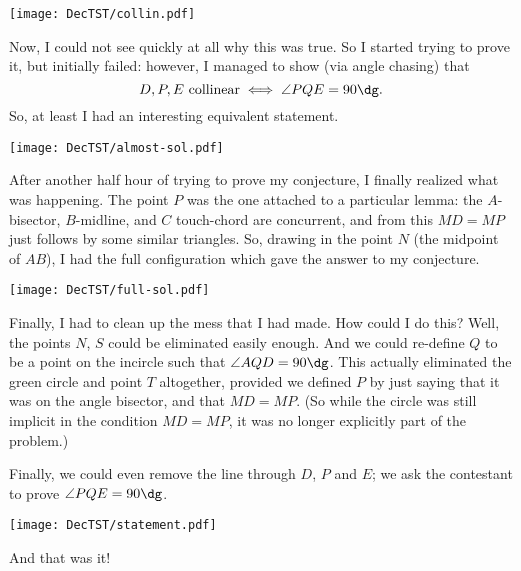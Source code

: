 \documentclass[11pt]{scrartcl}
\begin{document}
\begin{center}
  \texttt{[image: DecTST/collin.pdf]}
\end{center}

Now, I could not see quickly at all why this was true.
So I started trying to prove it, but initially failed:
however, I managed to show (via angle chasing) that
\[ D, P, E \text{ collinear}
  \iff \angle PQE = 90\dg. \]
So, at least I had an interesting equivalent statement.
\begin{center}
  \texttt{[image: DecTST/almost-sol.pdf]}
\end{center}

After another half hour of trying to prove my conjecture,
I finally realized what was happening.
The point $P$ was the one attached to a particular lemma:
the $A$-bisector, $B$-midline, and $C$ touch-chord are concurrent,
and from this $MD = MP$ just follows by some similar triangles.
So, drawing in the point $N$ (the midpoint of $AB$),
I had the full configuration which gave the answer to my conjecture.

\begin{center}
  \texttt{[image: DecTST/full-sol.pdf]}
\end{center}

Finally, I had to clean up the mess that I had made.
How could I do this?
Well, the points $N$, $S$ could be eliminated easily enough.
And we could re-define $Q$ to be a point on the incircle
such that $\angle AQD = 90\dg$.
This actually eliminated the green circle and point $T$ altogether,
provided we defined $P$ by just saying that it was on the angle
bisector, and that $MD = MP$.
(So while the circle was still implicit in the condition $MD = MP$,
it was no longer explicitly part of the problem.)

Finally, we could even remove the line through $D$, $P$ and $E$;
we ask the contestant to prove $\angle PQE = 90\dg$.

\begin{center}
  \texttt{[image: DecTST/statement.pdf]}
\end{center}

And that was it!

\eject
\end{document}
